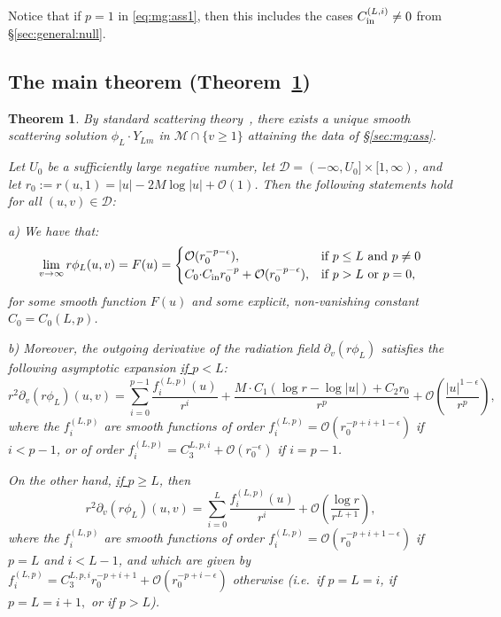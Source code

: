 \documentclass[11pt,english]{article}
\numberwithin{equation}{section}
\newtheorem{thm}{Theorem}[section]
\theoremstyle{remark}
\theoremstyle{plain}
\theoremstyle{remark}
\newcommand{\pv}{\partial_v}
\renewcommand{\(}{\left(}
\renewcommand{\)}{\right)}
\begin{document}
Notice that if $p=1$ in \eqref{eq:mg:ass1}, then this includes the cases $C_{\mathrm{in}}^{(L,i)}\neq 0$ from \S\ref{sec:general:null}.

\subsection{The main theorem (Theorem~\ref{thm:moreg})}
\begin{thm}\label{thm:moreg}
By standard scattering theory~\cite{DRSR18}, there exists a unique smooth scattering solution $\phi_L\cdot Y_{Lm}$ in $\mathcal{M}\cap\{v\geq 1\}$ attaining the data of \S\ref{sec:mg:ass}.

Let $U_0$ be a sufficiently large negative number, let $\mathcal{D}=(-\infty,U_0]\times[1,\infty)$, and let $r_0:=r(u,1)=|u|-2M\log|u|+\mathcal{O}(1)$. Then the following statements hold for all $(u,v)\in\mathcal D$:

a) We have that:
\begin{equation}\label{eq:mg:thma1}
\lim_{v\to\infty}r\phi_L(u,v)=F(u)=\begin{cases}
												\mathcal O(r_0^{-p-\epsilon}),&\text{if }p\leq L\text{ and } p\neq 0\\
												{C_0\cdot}C_{\mathrm{in}} r_0^{-p}+\mathcal O(r_0^{-p-\epsilon}), &\text{if }p>L \text{ or } p=0,
									\end{cases}
\end{equation}
for some smooth function $F(u)$ and some explicit, non-vanishing constant $C_0=C_0(L,p)$.


b) Moreover, the outgoing derivative of the radiation field $\pv(r\phi_L)$ satisfies the following asymptotic expansion \underline{if $p<L$}:
\begin{equation}\label{eq:mg:thmb1}
r^2\pv(r\phi_L)(u,v)=\sum_{i=0}^{p-1}\frac{f^{(L,p)}_i(u)}{r^i}+\frac{M\cdot C_1(\log r-\log|u|)+C_2 r_0}{r^p}+\mathcal{O}\left(\frac{|u|^{1-\epsilon}}{r^{p}}\right),
\end{equation}
where the $f^{(L,p)}_i$ are smooth functions of order $f^{(L,p)}_i=\mathcal O(r_0^{-p+i+1-\epsilon})$ if $i<p-1$, or of order $f^{(L,p)}_{i}=C_3^{L,p,i}+\mathcal O(r_0^{-\epsilon})$ if $i=p-1$.

On the other hand, \underline{if $p\geq L$}, then 
\begin{equation}\label{eq:mg:thmb2}
r^2\pv(r\phi_L)(u,v)=\sum_{i=0}^{L}\frac{f^{(L,p)}_i(u)}{r^i}+\mathcal O\left(\frac{\log r}{r^{L+1}}\right),
\end{equation}
where the $f^{(L,p)}_i$ are smooth functions of order $f^{(L,p)}_i=\mathcal O(r_0^{-p+i+1-\epsilon})$ if $p=L$ and $i<L-1$, and which are given by $f^{(L,p)}_i=C_3^{L,p,i}r_0^{-p+i+1}+\mathcal O(r_0^{-p+i-\epsilon})$ otherwise (i.e.\ if $p=L=i$, if $p=L=i+1,$ or if $p>L$).


\end{thm}
\end{document}
